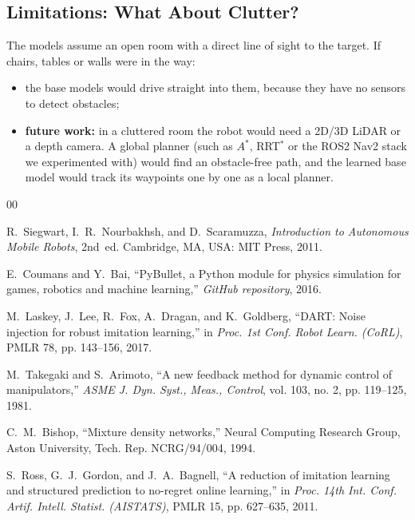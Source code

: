 \documentclass[conference]{IEEEtran}
\begin{document}
\subsection{Limitations: What About Clutter?}
\label{sec:limitations}
The models assume an open room with a direct line of sight to the target. If chairs, tables or walls were in the way:
\begin{itemize}
    \item the base models would drive straight into them, because they have no sensors to detect obstacles;
    \item \textbf{future work:} in a cluttered room the robot would need a 2D/3D LiDAR or a depth camera. A global planner (such as $A^*$, RRT$^*$ or the ROS2 Nav2 stack we experimented with) would find an obstacle-free path, and the learned base model would track its waypoints one by one as a local planner.
\end{itemize}

\begin{thebibliography}{00}

R.~Siegwart, I.~R.~Nourbakhsh, and D.~Scaramuzza, \textit{Introduction to Autonomous Mobile Robots}, 2nd~ed. Cambridge, MA, USA: MIT Press, 2011.

E.~Coumans and Y.~Bai, ``PyBullet, a Python module for physics simulation for games, robotics and machine learning,'' \textit{GitHub repository}, 2016.

M.~Laskey, J.~Lee, R.~Fox, A.~Dragan, and K.~Goldberg, ``DART: Noise injection for robust imitation learning,'' in \textit{Proc. 1st Conf. Robot Learn. (CoRL)}, PMLR 78, pp. 143--156, 2017.

M.~Takegaki and S.~Arimoto, ``A new feedback method for dynamic control of manipulators,'' \textit{ASME J. Dyn. Syst., Meas., Control}, vol. 103, no. 2, pp. 119--125, 1981.

C.~M.~Bishop, ``Mixture density networks,'' Neural Computing Research Group, Aston University, Tech. Rep. NCRG/94/004, 1994.

S.~Ross, G.~J.~Gordon, and J.~A.~Bagnell, ``A reduction of imitation learning and structured prediction to no-regret online learning,'' in \textit{Proc. 14th Int. Conf. Artif. Intell. Statist. (AISTATS)}, PMLR 15, pp. 627--635, 2011.

\end{thebibliography}
\end{document}
